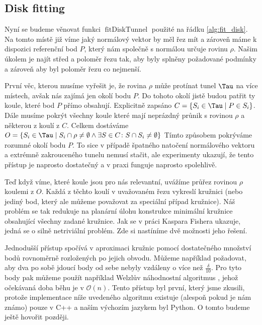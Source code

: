 \subsection{Disk fitting}
Nyní se budeme věnovat funkci $ \operatorname{fitDiskTunnel} $ použité na řádku
\ref{alg:fit_disk}. Na tomto místě již víme jaký normálový vektor by měl řez mít a
zároveň máme k dispozici referenční bod $ P $, který nám společně s normálou
určuje rovinu $ \rho $. Našim úkolem je najít střed a poloměr řezu tak, aby
byly splněny požadované podmínky a zároveň aby byl poloměr řezu co nejmenší.

První věc, kterou musíme vyřešit je, že rovina $ \rho $ může protínat tunel $ \Tau $
na více místech, avšak nás zajímá jen okolí bodu $ P $. Do tohoto okolí jistě
budou patřit ty koule, které bod $ P $ přímo obsahují. Explicitně
zapsáno $ C = \{S_i \in \Tau \mid P \in S_i \} $. Dále musíme pokrýt všechny
koule které mají neprázdný průnik s rovinou $ \rho $ a některou z koulí z $ C $.
Celkem dostáváme
$ O = \{ S_i \in \Tau \mid S_i \cap \rho \neq \emptyset \wedge \exists S \in C \colon S \cap S_i \neq \emptyset  \}$
Tímto způsobem pokrýváme rozumné okolí bodu $ P $. To sice v případě špatného
natočení normálového vektoru a extrémně zakrouceného tunelu nemusí stačit, ale
experimenty ukazují, že tento přístup je naprosto dostatečný a v praxi funguje
naprosto spolehlivě.

Teď když víme, které koule jsou pro nás relevantní, uvážíme průřez rovinou
$ \rho $ koulemi z $ O $. Každá z těchto koulí v uvažovaném řezu vykreslí
kružnici (nebo jediný bod, který ale můžeme považovat za speciální případ kružnice).
Náš problém se tak redukuje na planární úlohu konstrukce minimální kružnice obsahující
všechny zadané kružnice. Jak se v práci Kaspara Fishera \cite{FisherBalls} ukazuje,
jedná se o silně netriviální problém. Zde si nastíníme dvě možnosti jeho řešení.

Jednodušší přístup spočívá v aproximaci kružnic pomocí dostatečného množství bodů
rovnoměrně rozložených po jejich obvodu. Můžeme například požadovat, aby dva
po sobě jdoucí body od sebe nebyly vzdáleny o více než $ \frac{\delta}{10} $.
Pro tyto body pak můžeme použít například Welzlův náhodnostní algoritmus
\cite{WelzlRandom}, jehož očekávaná doba běhu je v $ \mathcal{O}(n) $. Tento
přístup byl první, který jsme zkusili, protože implementace níže uvedeného algoritmu
existuje (alespoň pokud je nám známo) pouze v C++ a naším výchozím jazykem byl
Python. O tomto budeme ještě hovořit později.

